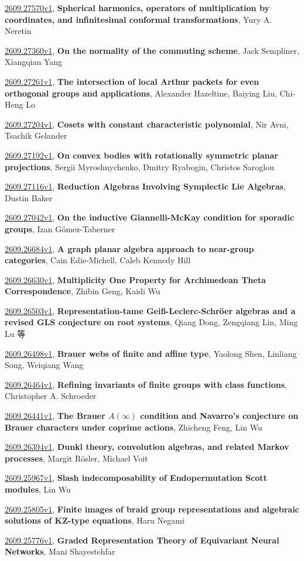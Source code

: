 \documentclass[9pt, a4paper]{article}
\theoremstyle{plain}
\theoremstyle{definition}
\theoremstyle{remark}
\newcommand{\arxiv}[3]{\href{https://arxiv.org/abs/#1}{#1}, \textbf{\textcolor{arxivblue}{#2}}, #3}
\begin{document}
\arxiv{2609.27570v1}{Spherical harmonics, operators of multiplication by coordinates, and infinitesimal conformal transformations}{Yury A. Neretin}

\arxiv{2609.27360v1}{On the normality of the commuting scheme}{Jack Sempliner, Xiangqian Yang}

\arxiv{2609.27261v1}{The intersection of local Arthur packets for even orthogonal groups and applications}{Alexander Hazeltine, Baiying Liu, Chi-Heng Lo}

\arxiv{2609.27204v1}{Cosets with constant characteristic polynomial}{Nir Avni, Tsachik Gelander}

\arxiv{2609.27192v1}{On convex bodies with rotationally symmetric planar projections}{Sergii Myroshnychenko, Dmitry Ryabogin, Christos Saroglou}

\arxiv{2609.27116v1}{Reduction Algebras Involving Symplectic Lie Algebras}{Dustin Baker}

\arxiv{2609.27042v1}{On the inductive Giannelli-McKay condition for sporadic groups}{Izan Gómez-Taberner}

\arxiv{2609.26684v1}{A graph planar algebra approach to near-group categories}{Cain Edie-Michell, Caleb Kennedy Hill}

\arxiv{2609.26630v1}{Multiplicity One Property for Archimedean Theta Correspondence}{Zhibin Geng, Kaidi Wu}

\arxiv{2609.26503v1}{Representation-tame Geiß-Leclerc-Schröer algebras and a revised GLS conjecture on root systems}{Qiang Dong, Zengqiang Lin, Ming Lu 等}

\arxiv{2609.26498v1}{Brauer webs of finite and affine type}{Yaolong Shen, Linliang Song, Weiqiang Wang}

\arxiv{2609.26464v1}{Refining invariants of finite groups with class functions}{Christopher A. Schroeder}

\arxiv{2609.26441v1}{The Brauer $A(\infty)$ condition and Navarro's conjecture on Brauer characters under coprime actions}{Zhicheng Feng, Lin Wu}

\arxiv{2609.26394v1}{Dunkl theory, convolution algebras, and related Markov processes}{Margit Rösler, Michael Voit}

\arxiv{2609.25967v1}{Slash indecomposability of Endopermutation Scott modules}{Lin Wu}

\arxiv{2609.25805v1}{Finite images of braid group representations and algebraic solutions of KZ-type equations}{Haru Negami}

\arxiv{2609.25776v1}{Graded Representation Theory of Equivariant Neural Networks}{Mani Shayestehfar}
\end{document}
